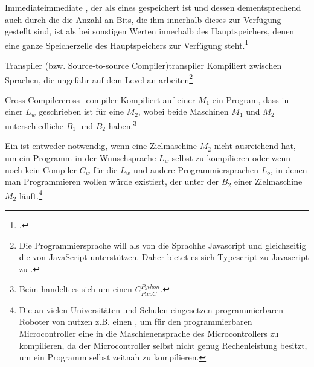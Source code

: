 \begin{Definition}{Immediate}{immediate}
  , der als  eines  gespeichert ist und dessen  dementsprechend auch durch die die Anzahl an Bits, die ihm innerhalb dieses  zur Verfügung gestellt sind,  ist als bei sonstigen Werten innerhalb des Hauptspeichers, denen eine ganze Speicherzelle des Hauptspeichers zur Verfügung steht.\footcite{ljohhuh_what_2018}
\end{Definition}

\begin{Definition}{Transpiler (bzw. Source-to-source Compiler)}{transpiler}
  Kompiliert zwischen Sprachen, die ungefähr auf dem  Level an  arbeiten\footnote{Die Programmiersprache  will als  von  die Sprachhe Javascript  und gleichzeitig die  von JavaScript unterstützen. Daher bietet es sich Typescript zu Javascript zu .}
\end{Definition}

\begin{Definition}{Cross-Compiler}{cross_compiler}
  Kompiliert auf einer  $M_1$ ein Program, dass in einer  $L_w$ geschrieben ist für eine  $M_2$, wobei beide Maschinen $M_1$ und $M_2$ unterschiedliche  $B_1$ und $B_2$ haben.\footnote{Beim  handelt es sich um einen  $C_{PicoC}^{Python}$.}
\end{Definition}

Ein  ist entweder notwendig, wenn eine Zielmaschine $M_2$ nicht ausreichend  hat, um ein Programm in der Wunschsprache $L_w$ selbst  zu kompilieren oder wenn noch kein Compiler $C_w$ für die  $L_w$ und andere Programmiersprachen $L_o$, in denen man Programmieren wollen würde existiert, der unter der  $B_2$ einer Zielmaschine $M_2$ läuft.\footnote{Die an vielen Universitäten und Schulen eingesetzen programmierbaren Roboter von  nutzen z.B. einen , um für den programmierbaren Microcontroller eine  in die Maschienensprache des Microcontrollers zu kompilieren, da der Microcontroller selbst nicht genug Rechenleistung besitzt, um ein Programm selbst zeitnah zu kompilieren.}

